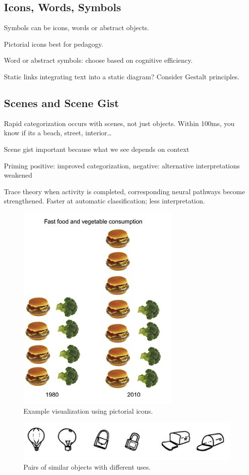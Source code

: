 \begin{mdframed}\begin{multicols}{2}
\subsection{Icons, Words, Symbols}
\begin{compactdesc}
\item[Symbols] can be icons, words or abstract objects.
\item[Pictorial icons] best for pedagogy.
\item[Word or abstract] symbols: choose based on cognitive efficiency.
\item[Static links] integrating text into a static diagram? Consider Gestalt
    principles.
\end{compactdesc}

\subsection{Scenes and Scene Gist}
\begin{compactdesc}
    \item[Rapid categorization] occurs with scenes, not just objects.
        Within 100ms, you know if its a beach, street, interior\dots
    \item[Scene gist] important because what we see depends on context
    \item[Priming] positive: improved categorization, negative: alternative
        interpretations weakened
    \item[Trace theory] when activity is completed, corresponding neural
        pathways become strengthened. Faster at automatic classification; less
        interpretation.
\end{compactdesc}

\begin{figure}[H]\centering
    \includegraphics[width=0.35\linewidth]{pictorial.png}
    \caption{Example visualization using pictorial icons.}
\end{figure}

\begin{figure}[H]\centering
    \includegraphics[width=0.5\linewidth]{similar_pairs.png}
    \caption{Pairs of similar objects with different uses.}
\end{figure}

\end{multicols}\end{mdframed}






